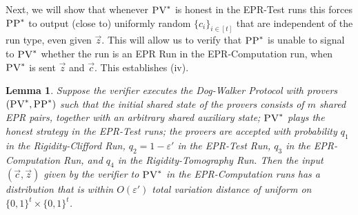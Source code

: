 \documentclass[11pt]{article}
\numberwithin{equation}{section}
\newtheorem{lemma}[theorem]{Lemma}
\theoremstyle{definition}
\theoremstyle{plain}
\newcommand{\eps}{\varepsilon}
\newcommand{\pv}{\textsc{PV}}
\newcommand{\pp}{\textsc{PP}}
\begin{document}
Next, we will show that whenever $\pv^*$ is honest in the EPR-Test runs this forces $\pp^*$ to output (close to) uniformly random $\{c_i\}_{i\in [t]}$ that are independent of the run type, even given $\vec{z}$. This will allow us to verify that $\pp^*$ is unable to signal to $\pv^*$ whether the run is an EPR Run in the EPR-Computation run, when $\pv^*$ is sent $\vec{z}$ and $\vec{c}$. This establishes (iv). 


\begin{lemma}\label{lem:ci-unif}
Suppose the verifier executes the Dog-Walker Protocol with provers $(\pv^*,\pp^*)$ such that the initial shared state of the provers consists of $m$ shared EPR pairs, together with an arbitrary shared auxiliary state; $\pv^*$ plays the honest strategy in the EPR-Test runs; the provers are accepted with probability $q_1$ in the Rigidity-Clifford Run, $q_2 = 1-\eps'$ in the EPR-Test Run, $q_3$ in the EPR-Computation Run, and $q_4$ in the Rigidity-Tomography Run. Then the input $(\vec{c},\vec{z})$ given by the verifier to $\pv^*$ in the EPR-Computation runs has a distribution that is within $O(\eps')$ total variation distance of uniform on $\{0,1\}^t\times\{0,1\}^t$. 
\end{lemma}
\end{document}
